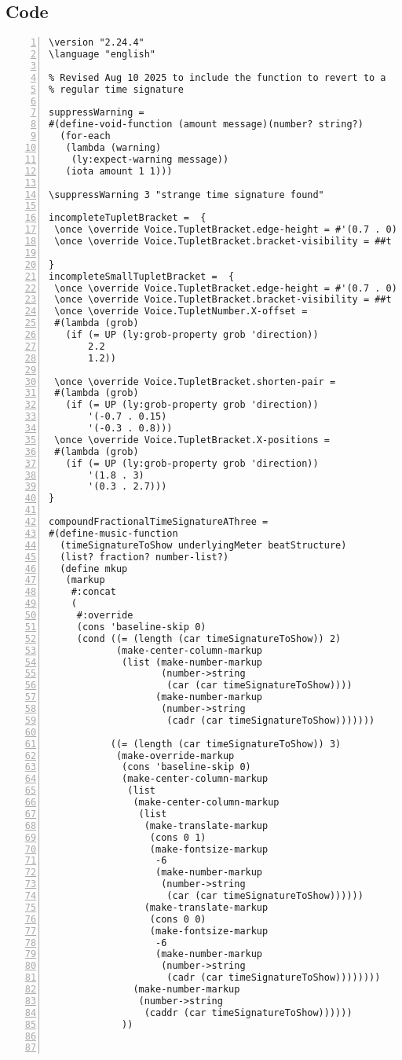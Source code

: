 \subsection{Code}
\begin{Verbatim}[numbers=left,xleftmargin=5mm]
\version "2.24.4"
\language "english"

% Revised Aug 10 2025 to include the function to revert to a
% regular time signature

suppressWarning =
#(define-void-function (amount message)(number? string?)
  (for-each
   (lambda (warning)
    (ly:expect-warning message))
   (iota amount 1 1)))

\suppressWarning 3 "strange time signature found"

incompleteTupletBracket =  {
 \once \override Voice.TupletBracket.edge-height = #'(0.7 . 0)
 \once \override Voice.TupletBracket.bracket-visibility = ##t

}
incompleteSmallTupletBracket =  {
 \once \override Voice.TupletBracket.edge-height = #'(0.7 . 0)
 \once \override Voice.TupletBracket.bracket-visibility = ##t
 \once \override Voice.TupletNumber.X-offset =
 #(lambda (grob)
   (if (= UP (ly:grob-property grob 'direction))
       2.2
       1.2))

 \once \override Voice.TupletBracket.shorten-pair =
 #(lambda (grob)
   (if (= UP (ly:grob-property grob 'direction))
       '(-0.7 . 0.15)
       '(-0.3 . 0.8)))
 \once \override Voice.TupletBracket.X-positions =
 #(lambda (grob)
   (if (= UP (ly:grob-property grob 'direction))
       '(1.8 . 3)
       '(0.3 . 2.7)))
}

compoundFractionalTimeSignatureAThree =
#(define-music-function
  (timeSignatureToShow underlyingMeter beatStructure)
  (list? fraction? number-list?)
  (define mkup
   (markup
    #:concat
    (
     #:override
     (cons 'baseline-skip 0)
     (cond ((= (length (car timeSignatureToShow)) 2)
            (make-center-column-markup
             (list (make-number-markup
                    (number->string
                     (car (car timeSignatureToShow))))
                   (make-number-markup
                    (number->string
                     (cadr (car timeSignatureToShow)))))))

           ((= (length (car timeSignatureToShow)) 3)
            (make-override-markup
             (cons 'baseline-skip 0)
             (make-center-column-markup
              (list
               (make-center-column-markup
                (list
                 (make-translate-markup
                  (cons 0 1)
                  (make-fontsize-markup
                   -6
                   (make-number-markup
                    (number->string
                     (car (car timeSignatureToShow))))))
                 (make-translate-markup
                  (cons 0 0)
                  (make-fontsize-markup
                   -6
                   (make-number-markup
                    (number->string
                     (cadr (car timeSignatureToShow))))))))
               (make-number-markup
                (number->string
                 (caddr (car timeSignatureToShow))))))
             ))



\end{Verbatim}
